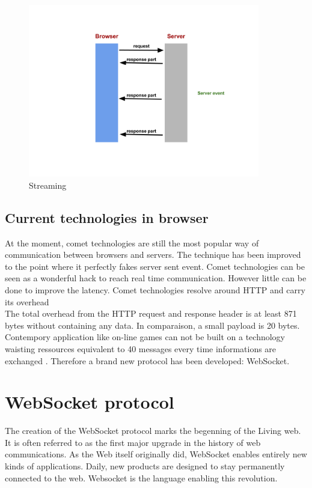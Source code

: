 \begin{figure}[htbp]
	\centering
		\includegraphics[width=0.9\textwidth]{./Figures/streaming.png}
	\caption[streaming]{Streaming}
	\label{fig:streaming}
\end{figure}

\subsection{Current technologies in browser}

At the moment, comet technologies are still the most popular way of communication between browsers and servers. The technique has been improved to the point where it perfectly fakes server sent event. Comet technologies can be seen as a wonderful hack to reach real time communication. However little can be done to improve the latency. Comet technologies resolve around HTTP and carry its overhead\\

The total overhead from the HTTP request and response header is at least 871 bytes without containing any data. In comparaison, a small payload is 20 bytes. Contempory application like on-line games can not be built on a technology waisting ressources equivalent to 40 messages every time informations are exchanged \citep{Reference2}. Therefore a brand new protocol has been developed: WebSocket.\\

\section{WebSocket protocol}

The creation of the WebSocket protocol marks the begenning of the Living web. It is often referred to as the first major upgrade in the history of web communications. As the Web itself originally did, WebSocket enables entirely new kinds of applications. Daily, new products are designed to stay permanently connected to the web. Websocket is the language enabling this revolution.\\

